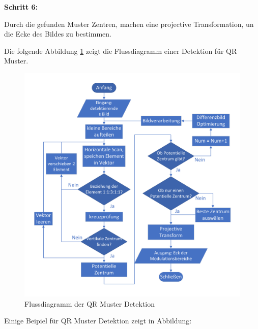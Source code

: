 \textbf{Schritt 6:}

Durch die gefunden Muster Zentren, machen eine projective Transformation, un die Ecke des Bildes zu bestimmen.


Die folgende Abbildung \ref{fig:FlussdiagrammQRMuster} zeigt die Flussdiagramm einer Detektion für QR Muster.

\begin{figure}[htb]
 \centering 
 \includegraphics[keepaspectratio,width=1.0\textwidth]{images/4_ZweiteErfahrung/QRMuster/QR_flussdiagramm.pdf}
 \caption{Flussdiagramm der QR Muster Detektion}
 \label{fig:FlussdiagrammQRMuster}
\end{figure}

Einige Beipiel für QR Muster Detektion zeigt in Abbildung:
